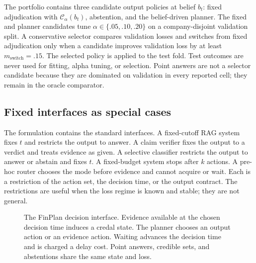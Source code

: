 \documentclass[11pt]{article}
\newcommand{\method}{FinPlan}
\begin{document}
The portfolio contains three candidate output policies at belief $b_t$: fixed adjudication with $\mathcal C_\alpha(b_t)$, abstention, and the belief-driven planner. The fixed and planner candidates tune $\alpha\in\{.05,.10,.20\}$ on a company-disjoint validation split. A conservative selector compares validation losses and switches from fixed adjudication only when a candidate improves validation loss by at least $m_{\text{switch}}=.15$. The selected policy is applied to the test fold. Test outcomes are never used for fitting, alpha tuning, or selection. Point answers are not a selector candidate because they are dominated on validation in every reported cell; they remain in the oracle comparator.

\subsection{Fixed interfaces as special cases}
The formulation contains the standard interfaces. A fixed-cutoff RAG system fixes $t$ and restricts the output to answer. A claim verifier fixes the output to a verdict and treats evidence as given. A selective classifier restricts the output to answer or abstain and fixes $t$. A fixed-budget system stops after $k$ actions. A pre-hoc router chooses the mode before evidence and cannot acquire or wait. Each is a restriction of the action set, the decision time, or the output contract. The restrictions are useful when the loss regime is known and stable; they are not general.

\begin{figure}[t]
\centering
{}
\caption{The \method{} decision interface. Evidence available at the chosen decision time induces a credal state. The planner chooses an output action or an evidence action. Waiting advances the decision time and is charged a delay cost. Point answers, credible sets, and abstentions share the same state and loss.}
\label{fig:interface}
\end{figure}
\end{document}
